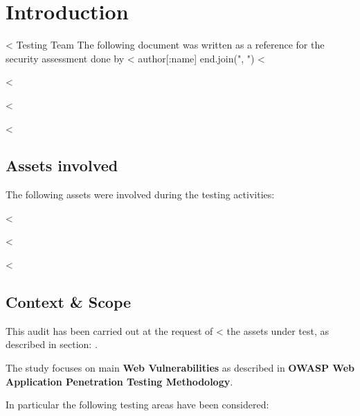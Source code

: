 

\chapter{Introduction}\label{ch:introduction}

  <%
         Testing Team %
  The following document was written as a reference for the security
  assessment done by <%
    author[:name]
  end.join(", ") %
  <%

  <%

    <%

  <%
  \section{Assets involved}\label{sec:assets}

    The following assets were involved during the testing activities:

    \begin{itemize}
      <%
        <%
          \item \textbf{<%
        <%
          \item \textbf{<%
        <%
      <%
    \end{itemize}

  <%

    <%

  <%
  \section{Context \& Scope}\label{sec:scope}

    This audit has been carried out at the request of
    <%
    the assets under test, as described in section: .

    The study focuses on main \textbf{Web Vulnerabilities} as described in
    \textbf{OWASP Web Application Penetration Testing Methodology}.

    In particular the following testing areas have been considered:

